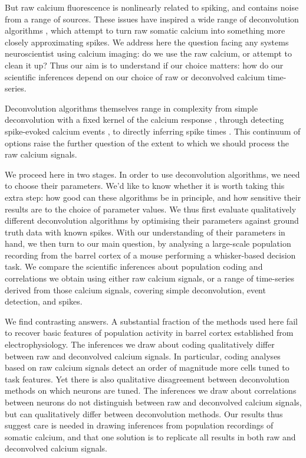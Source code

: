 \documentclass[a4paper,11pt]{article}
\begin{document}
But raw calcium fluorescence is nonlinearly related to spiking, and contains noise from a range of sources. These issues have inspired a wide range of deconvolution algorithms \citep{Theis2016-ee, Berens2018-su, Stringer2018-st}, which attempt to turn raw somatic calcium into something more closely approximating spikes. We address here the question facing any systems neuroscientist using calcium imaging: do we use the raw calcium, or attempt to clean it up? Thus our aim is to understand if our choice matters: how do our scientific inferences depend on our choice of raw or deconvolved calcium time-series.

Deconvolution algorithms themselves range in complexity from simple deconvolution with a fixed kernel of the calcium response \citep{Yaksi2006-ic}, through detecting spike-evoked calcium events \citep{Jewell2018-cx, Pachitariu2016-ui}, to directly inferring spike times \citep{Vogelstein2010-uc, Lutcke2013-wu, Deneux2016-gu}. This continuum of options raise the further question of the extent to which we should process the raw calcium signals. 

We proceed here in two stages. In order to use deconvolution algorithms, we need to choose their parameters. We’d like to know whether it is worth taking this extra step: how good can these algorithms be in principle, and how sensitive their results are to the choice of parameter values. We thus first evaluate qualitatively different deconvolution algorithms by optimising their parameters against ground truth data with known spikes. With our understanding of their parameters in hand, we then turn to our main question, by analysing a large-scale population recording from the barrel cortex of a mouse performing a whisker-based decision task. We compare the scientific inferences about population coding and correlations we obtain using either raw calcium signals, or a range of time-series derived from those calcium signals, covering simple deconvolution, event detection, and spikes. 

We find contrasting answers. A substantial fraction of the methods used here fail to recover basic features of population activity in barrel cortex established from electrophysiology. The inferences we draw about coding qualitatively differ between raw and deconvolved calcium signals. In particular, coding analyses based on raw calcium signals detect an order of magnitude more cells tuned to task features. Yet there is also qualitative disagreement between deconvolution methods on which neurons are tuned. The inferences we draw about correlations between neurons do not distinguish between raw and deconvolved calcium signals, but can qualitatively differ between deconvolution methods. Our results thus suggest care is needed in drawing inferences from population recordings of somatic calcium, and that one solution is to replicate all results in both raw and deconvolved calcium signals.
\end{document}
